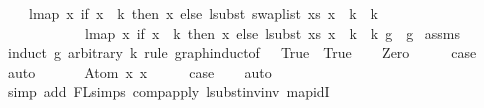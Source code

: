 \begin{isabellebody}
\ \ \ \ {\isachardoublequoteopen}lmap\ {\isacharparenleft}{\kern0pt}{\isasymlambda}x{\isachardot}{\kern0pt}\ if\ x\ {\isacharless}{\kern0pt}\ k\ then\ x\ else\ {\isacharparenleft}{\kern0pt}lsubst\ {\isacharparenleft}{\kern0pt}swap{\isacharunderscore}{\kern0pt}list\ xs{\isacharparenright}{\kern0pt}\ {\isacharparenleft}{\kern0pt}x\ {\isacharminus}{\kern0pt}\ k{\isacharparenright}{\kern0pt}\ {\isacharplus}{\kern0pt}\ k{\isacharparenright}{\kern0pt}{\isacharparenright}{\kern0pt}\isanewline
\ \ \ \ \ \ \ \ \ \ \ \ {\isacharparenleft}{\kern0pt}lmap\ {\isacharparenleft}{\kern0pt}{\isasymlambda}x{\isachardot}{\kern0pt}\ if\ x\ {\isacharless}{\kern0pt}\ k\ then\ x\ else\ {\isacharparenleft}{\kern0pt}lsubst\ xs\ {\isacharparenleft}{\kern0pt}x\ {\isacharminus}{\kern0pt}\ k{\isacharparenright}{\kern0pt}\ {\isacharplus}{\kern0pt}\ k{\isacharparenright}{\kern0pt}{\isacharparenright}{\kern0pt}\ g{\isacharparenright}{\kern0pt}\ {\isacharequal}{\kern0pt}\ g{\isachardoublequoteclose}\isanewline
%
\isadelimproof
%
\endisadelimproof
%
\isatagproof
{}\isamarkupfalse%
\ assms\isanewline
{}\isamarkupfalse%
\ {\isacharparenleft}{\kern0pt}induct\ g\ arbitrary{\isacharcolon}{\kern0pt}\ k\ rule{\isacharcolon}{\kern0pt}\ graph{\isachardot}{\kern0pt}induct{\isacharbrackleft}{\kern0pt}of\ {\isacharunderscore}{\kern0pt}\ {\isachardoublequoteopen}{\isacharpercent}{\kern0pt}{\isacharunderscore}{\kern0pt}{\isachardot}{\kern0pt}\ True{\isachardoublequoteclose}\ {\isachardoublequoteopen}{\isacharpercent}{\kern0pt}{\isacharunderscore}{\kern0pt}{\isachardot}{\kern0pt}\ True{\isachardoublequoteclose}{\isacharbrackright}{\kern0pt}{\isacharparenright}{\kern0pt}\isanewline
\ \ \isamarkupfalse%
\ Zero\isanewline
\ \ \isamarkupfalse%
\ \isamarkupfalse%
\ {\isacharquery}{\kern0pt}case\isanewline
\ \ \isamarkupfalse%
\ auto\isanewline
\ \ \isamarkupfalse%
\isanewline
{}\isamarkupfalse%
\isanewline
\ \ \isamarkupfalse%
\ {\isacharparenleft}{\kern0pt}Atom\ x{}\ x{}{\isacharparenright}{\kern0pt}\isanewline
\ \ \isamarkupfalse%
\ \isamarkupfalse%
\ {\isacharquery}{\kern0pt}case\isanewline
\ \ \isamarkupfalse%
\ auto\isanewline
\ \ \isamarkupfalse%
\ {\isacharparenleft}{\kern0pt}simp\ add{\isacharcolon}{\kern0pt}\ FL{\isachardot}{\kern0pt}simps{\isacharparenleft}{\kern0pt}{}{\isacharparenright}{\kern0pt}\ comp{\isacharunderscore}{\kern0pt}apply\ lsubst{\isacharunderscore}{\kern0pt}inv{\isacharunderscore}{\kern0pt}inv{}\ map{\isacharunderscore}{\kern0pt}idI{\isacharparenright}{\kern0pt}\isanewline

\end{isabellebody}
